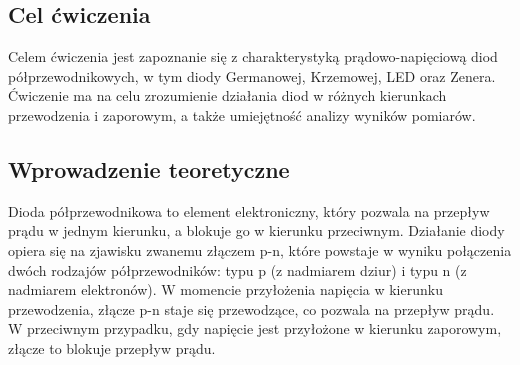 \documentclass[10pt]{article}
\begin{document}
\subsection*{Cel ćwiczenia}
Celem ćwiczenia jest zapoznanie się z charakterystyką prądowo-napięciową diod półprzewodnikowych, 
w tym diody Germanowej, Krzemowej, LED oraz Zenera. 
Ćwiczenie ma na celu zrozumienie działania diod w różnych kierunkach przewodzenia i zaporowym, a także umiejętność analizy wyników pomiarów.
\subsection*{Wprowadzenie teoretyczne}
Dioda półprzewodnikowa to element elektroniczny, który pozwala na przepływ prądu w jednym kierunku, 
a blokuje go w kierunku przeciwnym. Działanie diody opiera się na zjawisku zwanemu złączem p-n, 
które powstaje w wyniku połączenia dwóch rodzajów półprzewodników: typu p (z nadmiarem dziur) i typu n (z nadmiarem elektronów). 
W momencie przyłożenia napięcia w kierunku przewodzenia, złącze p-n staje się przewodzące, co pozwala na przepływ prądu. 
W przeciwnym przypadku, gdy napięcie jest przyłożone w kierunku zaporowym, złącze to blokuje przepływ prądu.
\clearpage
\end{document}
